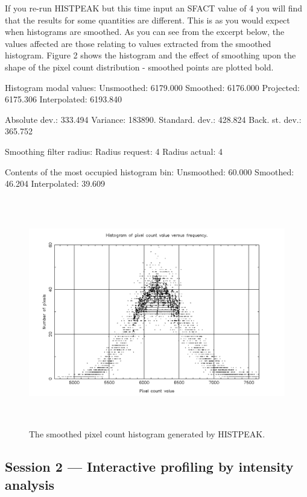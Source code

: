 \documentclass[twoside,11pt]{starlink}
\begin{document}
If you re-run HISTPEAK but this time input an SFACT value of 4 you will find
that the results for some quantities are different. This is as you would
expect when histograms are smoothed. As you can see from the excerpt below,
the values affected are those relating to values extracted from the
smoothed histogram. Figure 2 shows the histogram and the effect
of smoothing upon the shape of the pixel count distribution - smoothed
points are plotted bold.

\newpage
\begin{terminalv}
Histogram modal values:
Unsmoothed:              6179.000     Smoothed:             6176.000
Projected:               6175.306     Interpolated:         6193.840

Absolute dev.:            333.494     Variance:              183890.
Standard. dev.:           428.824     Back. st. dev.:        365.752

Smoothing filter radius:
Radius request:                 4     Radius actual:               4

Contents of the most occupied histogram bin:
Unsmoothed:                60.000     Smoothed:               46.204
Interpolated:              39.609
\end{terminalv}

\begin{figure}[htlb]
\centering
\includegraphics[height=100mm,width=150mm]{sun180_diag2}
\caption{The smoothed pixel count histogram generated by HISTPEAK.}
\end{figure}

\subsection{Session 2 --- Interactive profiling by intensity analysis}
\end{document}
